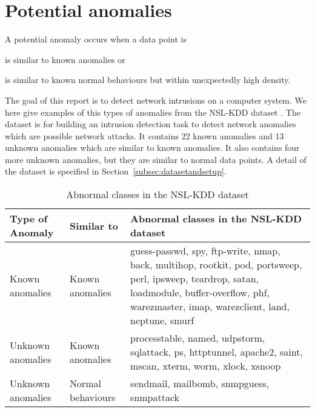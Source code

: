 \section{Potential anomalies}
A potential anomaly occurs when a data point is \begin{inparaenum}
\item is similar to known anomalies %
or 
\item is similar to known normal behaviours but within unexpectedly high density.
\end{inparaenum} 

The goal of this report is to detect network intrusions on a computer system. 
We here give examples of this types of anomalies from the NSL-KDD dataset \cite{tavallaee09}. 
The dataset is for building an intrusion detection task to detect network anomalies which are possible network attacks. 
It contains 22 known anomalies and 13 unknown anomalies which are similar to known anomalies. 
It also contains four more unknown anomalies, but they are similar to normal data points.
A detail of the dataset is specified in Section~\ref{subsec:datasetandsetup}. 

\begin{table}[h]
\begin{center}
\begin{tabular}{| l | l | p{5cm} |}
\hline
Type of Anomaly & Similar to & Abnormal classes in the NSL-KDD dataset \\
\hline
Known anomalies & Known anomalies & guess-passwd, spy, ftp-write, nmap, back, multihop, rootkit, pod, portsweep, perl, ipsweep, teardrop, satan, loadmodule, buffer-overflow, phf, warezmaster, imap, warezclient, land, neptune, smurf \\ %
\hline
Unknown anomalies & Known anomalies & processtable, named, udpstorm, sqlattack, ps, httptunnel, apache2, saint, mscan, xterm, worm, xlock, xsnoop \\ %
\hline
Unknown anomalies & Normal behaviours & sendmail, mailbomb, snmpguess, snmpattack \\ %
\hline
\end{tabular}
\end{center}
\caption{Abnormal classes in the NSL-KDD dataset}
\label{fig:anomalyclasses}
\end{table}

